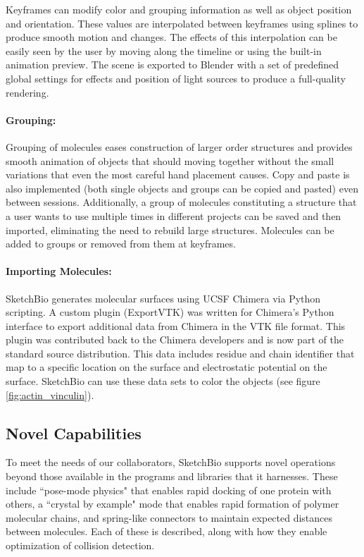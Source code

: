\documentclass[twocolumn]{bmcart}%
\begin{document}
Keyframes can modify color and grouping information as well as object position and orientation.
These values are interpolated between keyframes using splines to produce smooth motion and changes.
The effects of this interpolation can be easily seen by the user by moving along the timeline or using the built-in animation preview.
The scene is exported to Blender with a set of predefined global settings for effects and position of light sources to produce a full-quality rendering.

\paragraph*{Grouping:}
Grouping of molecules eases construction of larger order structures and provides smooth animation of objects that should moving together without the small variations that even the most careful hand placement causes.
Copy and paste is also implemented (both single objects and groups can be copied and pasted) even between sessions. Additionally, a group of molecules constituting a structure that a user wants to use multiple times in different projects can be saved and then imported, eliminating the need to rebuild large structures.
Molecules can be added to groups or removed from them at keyframes.

\paragraph*{Importing Molecules:}
SketchBio generates molecular surfaces using UCSF Chimera via Python scripting.
A custom plugin (ExportVTK) was written for Chimera's Python interface to export additional data from Chimera in the VTK file format.
This plugin was contributed back to the Chimera developers and is now part of the standard source distribution.
This data includes residue and chain identifier that map to a specific location on the surface and electrostatic potential on the surface.
SketchBio can use these data sets to color the objects (see figure \ref{fig:actin_vinculin}).

\subsection*{Novel Capabilities}

To meet the needs of our collaborators, SketchBio supports novel operations beyond those available in the programs and libraries that it harnesses.
These include ``pose-mode physics" that enables rapid docking of one protein with others, a ``crystal by example" mode that enables rapid formation of polymer molecular chains, and spring-like connectors to maintain expected distances between molecules.
Each of these is described, along with how they enable optimization of collision detection.
\end{document}

